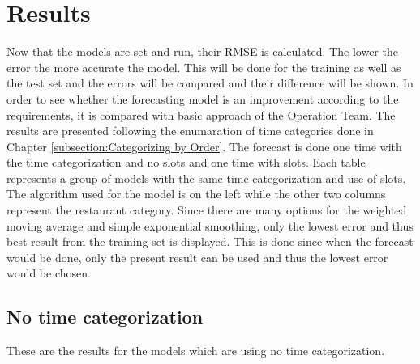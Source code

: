 \chapter{Results}\label{chapter:Results}
Now that the models are set and run, their RMSE is calculated. The lower the error the more accurate the model. This will be done for the training as well as the test set and the errors will be compared and their difference will be shown. \newline
In order to see whether the forecasting model is an improvement according to the requirements, it is compared with basic approach of the Operation Team.\newlone
The results are presented following the enumaration of time categories done in Chapter \ref{subsection:Categorizing by Order}. The forecast is done one time with the time categorization and no slots and one time with slots.\newline
Each table represents a group of models with the same time categorization and use of slots. The algorithm used for the model is on the left while the other two columns represent the restaurant category. Since there are many options for the weighted moving average and simple exponential smoothing, only the lowest error and thus best result from the training set is displayed. This is done since when the forecast would be done, only the present result can be used and thus the lowest error would be chosen.
\section{No time categorization}\label{section:No time categorization}
These are the results for the models which are using no time categorization.
